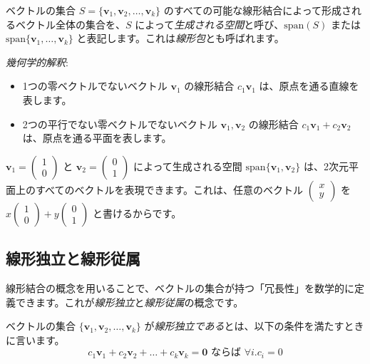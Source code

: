 \begin{dfn} \label{linear_span}
ベクトルの集合 $S = \{ \bm{v}_1, \bm{v}_2, \ldots, \bm{v}_k \}$ のすべての可能な線形結合によって形成されるベクトル全体の集合を、$S$ によって\emph{生成される空間}と呼び、$\text{span}(S)$ または $\text{span}\{\bm{v}_1, \ldots, \bm{v}_k\}$ と表記します。これは\emph{線形包}とも呼ばれます。
\end{dfn}

\emph{幾何学的解釈}:
\begin{itemize}
\item 1つの零ベクトルでないベクトル $\bm{v}_1$ の線形結合 $c_1 \bm{v}_1$ は、原点を通る直線を表します。
\item 2つの平行でない零ベクトルでないベクトル $\bm{v}_1, \bm{v}_2$ の線形結合 $c_1 \bm{v}_1 + c_2 \bm{v}_2$ は、原点を通る平面を表します。
\end{itemize}

\begin{ex}
$\bm{v}_1 = \begin{pmatrix} 1 \\ 0 \end{pmatrix}$ と $\bm{v}_2 = \begin{pmatrix} 0 \\ 1 \end{pmatrix}$ によって生成される空間 $\text{span}\{\bm{v}_1, \bm{v}_2\}$ は、2次元平面上のすべてのベクトルを表現できます。これは、任意のベクトル $\begin{pmatrix} x \\ y \end{pmatrix}$ を $x\begin{pmatrix} 1 \\ 0 \end{pmatrix} + y\begin{pmatrix} 0 \\ 1 \end{pmatrix}$ と書けるからです。
\end{ex}

\subsection{線形独立と線形従属}

線形結合の概念を用いることで、ベクトルの集合が持つ「冗長性」を数学的に定義できます。これが\emph{線形独立}と\emph{線形従属}の概念です。

\begin{dfn}[線形独立] \label{linear_independence}
ベクトルの集合 $\{\bm{v}_1, \bm{v}_2, \ldots, \bm{v}_k\}$ が\emph{線形独立である}とは、以下の条件を満たすときに言います。
\[c_1 \bm{v}_1 + c_2 \bm{v}_2 + \dots + c_k \bm{v}_k = \bm{0}\text{ ならば }\forall i.c_i=0\]
\end{dfn}

